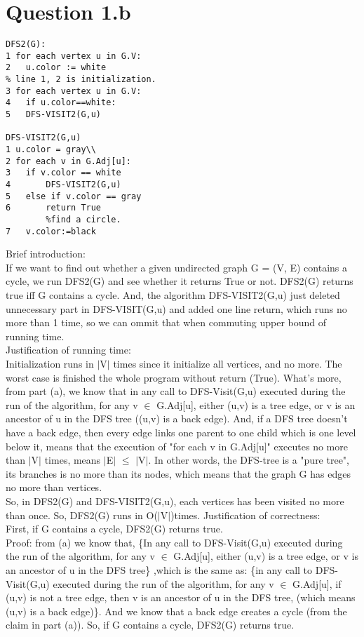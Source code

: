 \documentclass{article}
\begin{document}
\section{Question 1.b}
\begin{lstlisting}
DFS2(G):
1 for each vertex u in G.V:
2 	u.color := white
% line 1, 2 is initialization.
3 for each vertex u in G.V:
4 	if u.color==white:
5	DFS-VISIT2(G,u)

DFS-VISIT2(G,u)
1 u.color = gray\\
2 for each v in G.Adj[u]:
3	if v.color == white
4		DFS-VISIT2(G,u)
5	else if v.color == gray
6 		return True
		%find a circle.
7	v.color:=black

\end{lstlisting}
Brief introduction:\\
 If we want to find out whether a given undirected graph G = (V, E) contains a cycle, we run DFS2(G) and see whether it returns True or not. DFS2(G) returns true iff G contains a cycle. And, the algorithm DFS-VISIT2(G,u) just deleted unnecessary part in DFS-VISIT(G,u) and added one line return, which runs no more than 1 time, so we can ommit that when commuting upper bound of running time. \\
Justification of running time: \\
Initialization runs in $|$V$|$ times since it initialize all vertices, and no more. The worst case is finished the whole program without return (True). What's more, from part (a), we know that in any call to DFS-Visit(G,u) executed during the run of the algorithm, for any v $\in$ G.Adj[u], either (u,v) is a tree edge, or v is an ancestor of u in the DFS tree ((u,v) is a back edge). And, if a DFS tree doesn't have a back edge, then every edge links one parent to one child which is one level below it, means that the execution of "for each v in G.Adj[u]" executes no more than $|$V$|$ times, means $|$E$|$ $\leq$ $|$V$|$. In other words, the DFS-tree is a "pure tree", its branches is no more than its nodes, which means that the graph G has edges no more than vertices.\\
So, in DFS2(G) and DFS-VISIT2(G,u), each vertices has been visited no more than once. So, DFS2(G) runs in O($|$V$|$)times.
Justification of correctness: \\
First, if G contains a cycle, DFS2(G) returns true.\\
Proof: from (a) we know that, \{In any call to DFS-Visit(G,u) executed during the run of the algorithm, for any v $\in$ G.Adj[u], either (u,v) is a tree edge, or v is an ancestor of u in the DFS tree\} ,which is the same as: \{in any call to DFS-Visit(G,u) executed during the run of the algorithm, for any v $\in$ G.Adj[u], if (u,v) is not a tree edge, then v is an ancestor of u in the DFS tree, (which means (u,v) is a back edge)\}. And we know that a back edge creates a cycle (from the claim in part (a)). So, if G contains a cycle, DFS2(G) returns true.
\end{document}
